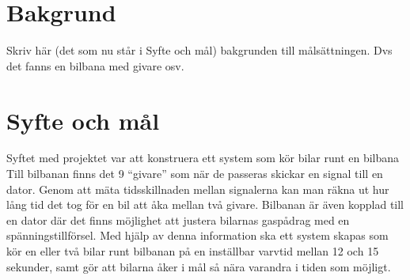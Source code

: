 \section{Bakgrund}
Skriv här (det som nu står i Syfte och mål) bakgrunden till målsättningen. Dvs det fanns en bilbana med givare osv.

\section{Syfte och mål}
Syftet med projektet var att konstruera ett system som kör bilar runt en bilbana
Till bilbanan finns det 9 ``givare'' som när
de passeras skickar en signal till en dator. Genom att mäta tidsskillnaden
mellan signalerna kan man räkna ut hur lång tid det tog för en bil att åka
mellan två givare. Bilbanan är även kopplad till en dator där det finns
möjlighet att justera bilarnas gaspådrag med en spänningstillförsel. Med hjälp
av denna information ska ett system skapas som kör en eller två bilar runt
bilbanan på en inställbar varvtid mellan 12 och 15 sekunder, samt gör att
bilarna åker i mål så nära varandra i tiden som möjligt.

